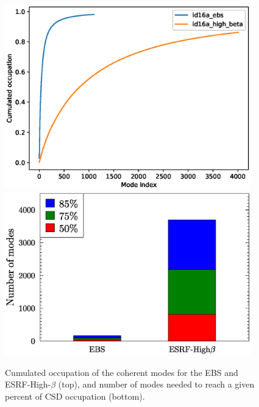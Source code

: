 \documentclass{iucr}              %
\begin{document}
\begin{figure}\label{fig:histomodes}
    \centering
        \includegraphics[width=0.95\textwidth]{GRAPHICS/cumulated_occupation.eps}
        \includegraphics[width=0.95\textwidth]{GRAPHICS/up_to_mode_id16a.eps}
    \caption{Cumulated occupation of the coherent modes for the EBS and ESRF-High-$\beta$ (top), and number of modes needed to reach a given percent of CSD occupation (bottom). }
\end{figure}
\end{document}
